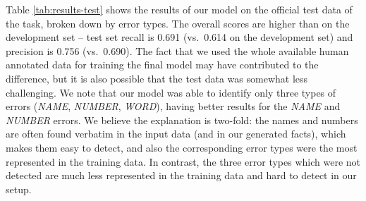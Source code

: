 Table \ref{tab:results-test} shows the results of our model on the official test data of the task, broken down by error types. The overall scores are higher than on the development set -- test set recall is 0.691 (vs.~0.614 on the development set) and precision is 0.756 (vs.~0.690). The fact that we used the whole available human annotated data for training the final model may have contributed to the difference, but it is also possible that the test data was somewhat less challenging. We note that our model was able to identify only three types of errors (\textit{NAME}, \textit{NUMBER}, \textit{WORD}), having better results for the \textit{NAME} and \textit{NUMBER} errors. We believe the explanation is two-fold: the names and numbers are often found verbatim in the input data (and in our generated facts), which makes them easy to detect, and also the corresponding error types were the most represented in the training data. In contrast, the three error types which were not detected are much less represented in the training data and hard to detect in our setup.

